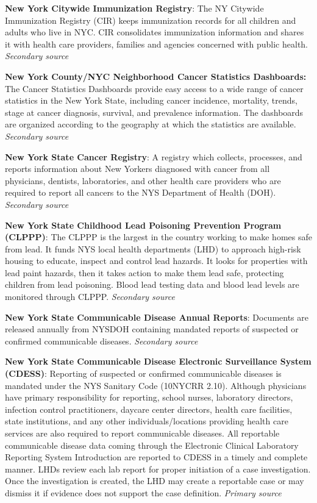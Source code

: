 \documentclass[
  english,
  letterpaper,
]{report}
\begin{document}
\textbf{New York Citywide Immunization Registry}: The NY Citywide
Immunization Registry (CIR) keeps immunization records for all children
and adults who live in NYC. CIR consolidates immunization information
and shares it with health care providers, families and agencies
concerned with public health. \emph{Secondary source}

\textbf{New York County/NYC Neighborhood Cancer Statistics Dashboards:}
The Cancer Statistics Dashboards provide easy access to a wide range of
cancer statistics in the New York State, including cancer incidence,
mortality, trends, stage at cancer diagnosis, survival, and prevalence
information. The dashboards are organized according to the geography at
which the statistics are available. \emph{Secondary source}

\textbf{New York State Cancer Registry}: A registry which collects,
processes, and reports information about New Yorkers diagnosed with
cancer from all physicians, dentists, laboratories, and other health
care providers who are required to report all cancers to the NYS
Department of Health (DOH). \emph{Secondary source}

\textbf{New York State Childhood Lead Poisoning Prevention Program
(CLPPP)}: The CLPPP is the largest in the country working to make homes
safe from lead. It funds NYS local health departments (LHD) to approach
high-risk housing to educate, inspect and control lead hazards. It looks
for properties with lead paint hazards, then it takes action to make
them lead safe, protecting children from lead poisoning. Blood lead
testing data and blood lead levels are monitored through CLPPP.
\emph{Secondary source}

\textbf{New York State Communicable Disease Annual Reports}: Documents
are released annually from NYSDOH containing mandated reports of
suspected or confirmed communicable diseases. \emph{Secondary source}

\textbf{New York State Communicable Disease Electronic Surveillance
System (CDESS)}: Reporting of suspected or confirmed communicable
diseases is mandated under the NYS Sanitary Code (10NYCRR 2.10).
Although physicians have primary responsibility for reporting, school
nurses, laboratory directors, infection control practitioners, daycare
center directors, health care facilities, state institutions, and any
other individuals/locations providing health care services are also
required to report communicable diseases. All reportable communicable
disease data coming through the Electronic Clinical Laboratory Reporting
System Introduction are reported to CDESS in a timely and complete
manner. LHDs review each lab report for proper initiation of a case
investigation. Once the investigation is created, the LHD may create a
reportable case or may dismiss it if evidence does not support the case
definition. \emph{Primary source}
\end{document}
